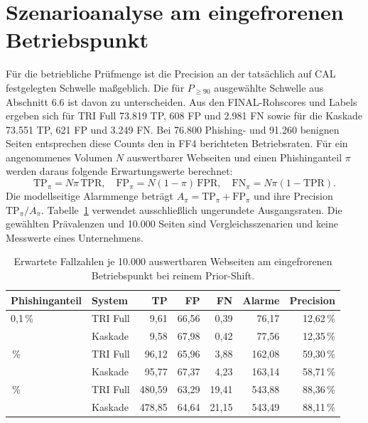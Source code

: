 \section{Szenarioanalyse am eingefrorenen Betriebspunkt}
\label{sec:betriebspunkt_szenarien}

Für die betriebliche Prüfmenge ist die Precision an der tatsächlich auf CAL festgelegten
Schwelle maßgeblich. Die für $P_{\geq 90}$ ausgewählte Schwelle aus Abschnitt 6.6 ist davon
zu unterscheiden. Aus den FINAL-Rohscores und Labels ergeben sich für TRI Full
73.819 TP, 608 FP und 2.981 FN sowie für die Kaskade 73.551 TP, 621 FP und 3.249 FN.
Bei 76.800 Phishing- und 91.260 benignen Seiten entsprechen diese Counts den in FF4
berichteten Betriebsraten. Für ein angenommenes Volumen $N$ auswertbarer Webseiten und
einen Phishinganteil $\pi$ werden daraus folgende Erwartungswerte berechnet:
\[
\mathrm{TP}_{\pi}=N\pi\,\mathrm{TPR},\quad
\mathrm{FP}_{\pi}=N(1-\pi)\,\mathrm{FPR},\quad
\mathrm{FN}_{\pi}=N\pi(1-\mathrm{TPR}).
\]
Die modellseitige Alarmmenge beträgt $A_{\pi}=\mathrm{TP}_{\pi}+\mathrm{FP}_{\pi}$ und ihre
Precision $\mathrm{TP}_{\pi}/A_{\pi}$. Tabelle~\ref{tab:business_operating_scenarios}
verwendet ausschließlich ungerundete Ausgangsraten. Die gewählten Prävalenzen und
10.000 Seiten sind Vergleichsszenarien und keine Messwerte eines Unternehmens.

\begin{table}[htbp]
\centering
\caption{Erwartete Fallzahlen je 10.000 auswertbaren Webseiten am eingefrorenen Betriebspunkt bei reinem Prior-Shift.}
\label{tab:business_operating_scenarios}
\small
\begin{tabular}{llrrrrr}
\toprule
Phishinganteil & System & TP & FP & FN & Alarme & Precision \\
\midrule
0,1\,\% & TRI Full & 9,61 & 66,56 & 0,39 & 76,17 & 12,62\,\% \\
         & Kaskade & 9,58 & 67,98 & 0,42 & 77,56 & 12,35\,\% \\
\addlinespace
1\,\% & TRI Full & 96,12 & 65,96 & 3,88 & 162,08 & 59,30\,\% \\
       & Kaskade & 95,77 & 67,37 & 4,23 & 163,14 & 58,71\,\% \\
\addlinespace
5\,\% & TRI Full & 480,59 & 63,29 & 19,41 & 543,88 & 88,36\,\% \\
       & Kaskade & 478,85 & 64,64 & 21,15 & 543,49 & 88,11\,\% \\
\bottomrule
\end{tabular}
\end{table}

